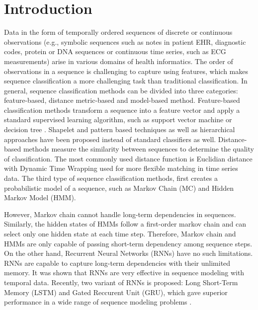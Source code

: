 \documentclass{amia_summit_2018}
\begin{document}
\section*{Introduction}
Data in the form of temporally ordered sequences of discrete or continuous observations (e.g., symbolic sequences such as notes in patient EHR, diagnostic codes, protein or DNA sequences or continuous time series, such as ECG measurements) arise in various domains of health informatics. The order of observations in a sequence is challenging to capture using features, which makes sequence classification a more challenging task than traditional classification. In general, sequence classification methods can be divided into three categories: feature-based, distance metric-based and model-based method. Feature-based classification methods transform a sequence into a feature vector and apply a standard supervised learning algorithm, such as support vector machine \cite{leslie2004fast} or decision tree \cite{chuzhanova1998feature}. Shapelet \cite{ye2009time} and pattern \cite{kudenko1998feature, lesh1999mining} based techniques as well as hierarchical approaches \cite{nallam2016effective} have been proposed instead of standard classifiers as well. Distance-based methods measure the similarity between sequences to determine the quality of classification. The most commonly used distance function is Euclidian distance \cite{keogh2003need} with Dynamic Time Wrapping \cite{keogh2000scaling} used for more flexible matching in time series data. The third type of sequence classification methods, first creates a probabilistic model of a sequence, such as Markov Chain (MC) and Hidden Markov Model \cite{rabiner1989tutorial} (HMM). 

However, Markov chain cannot handle long-term dependencies in sequences. Similarly, the hidden states of HMMs follow a first-order markov chain and can select only one hidden state at each time step. Therefore, Markov chain and HMMs are only capable of passing short-term dependency among sequence steps. On the other hand, Recurrent Neural Networks (RNNs) have no such limitations. RNNs are capable to capture long-term dependencies with their unlimited memory. It was shown that RNNs are very effective in sequence modeling with temporal data.  Recently, two variant of RNNs is proposed: Long Short-Term Memory\cite{graves2013speech} (LSTM) and Gated Reccurent Unit\cite{chung2014empirical} (GRU), which gave superior performance in a wide range of sequence modeling problems \cite{nion2013handwritten, lipton2015learning, choi2016doctor}.       
\end{document}
